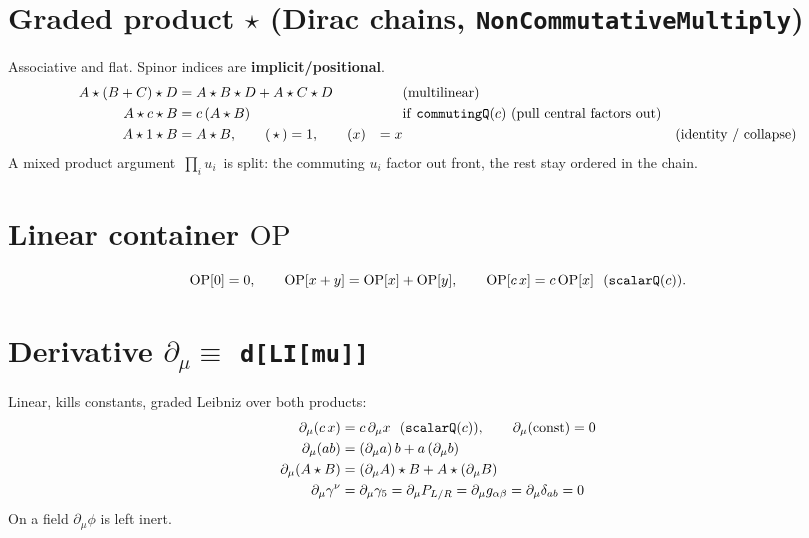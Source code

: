 \documentclass[11pt]{article}
\newcommand{\g}{g}
\newcommand{\OP}{\mathrm{OP}}
\newcommand{\gm}[1]{\gamma^{#1}}
\newcommand{\gfive}{\gamma_5}
\newcommand{\code}[1]{\texttt{#1}}
\begin{document}
\section{Graded product \texorpdfstring{$\star$}{**} (Dirac chains, \code{NonCommutativeMultiply})}
Associative and flat. Spinor indices are \textbf{implicit/positional}.
\begin{align}
A\star(B+C)\star D &= A\star B\star D + A\star C\star D &&\text{(multilinear)}\\
A\star c\star B &= c\,(A\star B) &&\text{if \code{commutingQ}$(c)$ (pull central factors out)}\\
A\star 1 \star B &= A\star B, \qquad (\,\star\,) = 1, \qquad (x) &= x &&\text{(identity / collapse)}
\end{align}
A mixed product argument $\,\prod_i u_i\,$ is split: the commuting $u_i$ factor out
front, the rest stay ordered in the chain.

\section{Linear container \texorpdfstring{$\OP$}{OP}}
\begin{equation}
\OP[0]=0,\qquad \OP[x+y]=\OP[x]+\OP[y],\qquad \OP[c\,x]=c\,\OP[x]\ \ (\text{\code{scalarQ}}(c)).
\end{equation}

\section{Derivative \texorpdfstring{$\partial_\mu \equiv$ \code{d[LI[mu]]}}{d}}
Linear, kills constants, graded Leibniz over both products:
\begin{align}
\partial_\mu(c\,x) &= c\,\partial_\mu x \ \ (\text{\code{scalarQ}}(c)), \qquad \partial_\mu(\text{const})=0\\
\partial_\mu(ab) &= (\partial_\mu a)\,b + a\,(\partial_\mu b)\\
\partial_\mu(A\star B) &= (\partial_\mu A)\star B + A\star(\partial_\mu B)\\
\partial_\mu\gm{\nu} &= \partial_\mu\gfive = \partial_\mu P_{L/R}
   = \partial_\mu \g_{\alpha\beta} = \partial_\mu \delta_{ab} = 0
\end{align}
On a field $\partial_\mu\phi$ is left inert.

\end{document}
